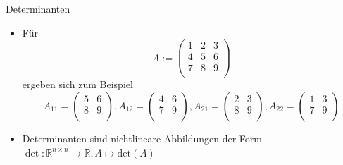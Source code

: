 \documentclass[
  8pt,
  ignorenonframetext,
]{beamer}
\providecommand{\tightlist}{%
  \setlength{\itemsep}{0pt}\setlength{\parskip}{0pt}}
\begin{document}
\begin{frame}{Determinanten}
\begin{itemize}
\tightlist
\item
  Für \begin{equation}
  A :=
  \begin{pmatrix}
  1 & 2 & 3 \\
  4 & 5 & 6 \\
  7 & 8 & 9 \\
  \end{pmatrix}
  \end{equation} ergeben sich zum Beispiel \begin{equation}
  A_{11}
  =
  \begin{pmatrix}
  5 & 6 \\
  8 & 9 \\
  \end{pmatrix},
  A_{12}
  =
  \begin{pmatrix}
  4 & 6 \\
  7 & 9 \\
  \end{pmatrix},
  A_{21}
  =
  \begin{pmatrix}
  2 & 3 \\
  8 & 9 \\
  \end{pmatrix},
  A_{22}
  =
  \begin{pmatrix}
  1 & 3 \\
  7 & 9 \\
  \end{pmatrix}
  \end{equation}
\item
  Determinanten sind nichtlineare Abbildungen der Form
  \(\det: \mathbb{R}^{n \times n} \to \mathbb{R}, A \mapsto \mbox{det}(A)\)
\end{itemize}
\end{frame}
\end{document}
